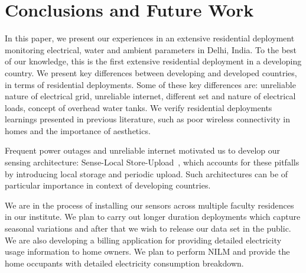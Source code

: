 \documentclass[10pt]{sensys-proc}
\newcommand{\paradigms}{Sense-Local Store-Upload~}
\begin{document}
\section{Conclusions and Future Work}
In this paper, we present our experiences in an extensive residential deployment monitoring electrical, water and ambient parameters in Delhi, India. To the best of our knowledge, this is the first extensive residential deployment in a developing country. We present key differences between developing and developed countries, in terms of residential deployments. Some of these key differences are: unreliable nature of electrical grid, unreliable internet, different set and nature of electrical loads, concept of overhead water tanks. We verify residential deployments learnings presented in previous literature, such as poor wireless connectivity in homes and the importance of aesthetics.

Frequent power outages and unreliable internet motivated us to develop our sensing architecture: \paradigms, which accounts for these pitfalls by introducing local storage and periodic upload. Such architectures can be of particular importance in context of developing countries. 

We are in the process of installing our sensors across multiple faculty residences in our institute. We plan to carry out longer duration deployments which capture seasonal variations and after that we wish to release our data set in the public. We are also developing a billing application for providing detailed electricity usage information to home owners. We plan to perform NILM and provide the home occupants with detailed electricity consumption breakdown.
\balance

 
\end{document}
